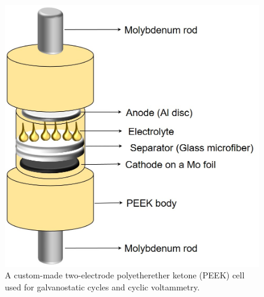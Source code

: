 \begin{figure}[tbh!]
  \centering
  \includegraphics[width=\textwidth]{SF/PEEK}
    \caption{A custom-made two-electrode polyetherether ketone (PEEK) cell used for galvanostatic cycles and cyclic voltammetry.}
  \label{SF:PEEK}
\end{figure}

